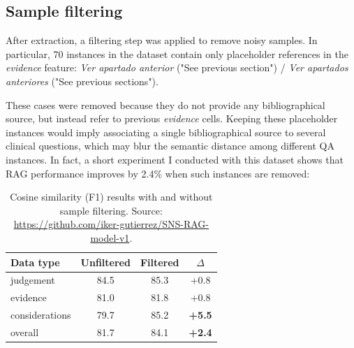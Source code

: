 \documentclass[11pt,a4paper]{article}
\begin{document}

\subsection{Sample filtering}

After extraction, a filtering step was applied to remove noisy samples. In particular, 70 instances in the dataset contain only placeholder references in the \textit{evidence} feature: \textit{Ver apartado anterior} ("See previous section") / \textit{Ver apartados anteriores} ("See previous sections").

These cases were removed because they do not provide any bibliographical source, but instead refer to previous \textit{evidence} cells. Keeping these placeholder instances would imply associating a single bibliographical source to several clinical questions, which may blur the semantic distance among different QA instances. In fact, a short experiment I conducted with this dataset shows that RAG performance improves by 2.4\% when such instances are removed:

\begin{table}[H]
\centering
\begin{tabular}{lccc}
\toprule
\textbf{Data type} & \textbf{Unfiltered} & \textbf{Filtered} & \textbf{$\Delta$} \\
\midrule
judgement        & 84.5 & 85.3 & +0.8 \\
evidence         & 81.0 & 81.8 & +0.8 \\
considerations   & 79.7 & 85.2 & \textbf{+5.5} \\
overall & 81.7 & 84.1 & \textbf{+2.4} \\
\bottomrule
\end{tabular}
\caption{Cosine similarity (F1) results with and without sample filtering. Source: \url{https://github.com/iker-gutierrez/SNS-RAG-model-v1}.}
\label{tab:cosine_results}
\end{table}
 
\end{document}
